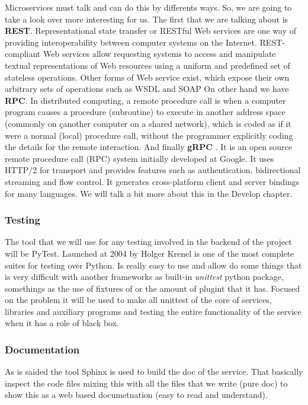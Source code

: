 Microservices must talk and can do this by differents ways. So, we are going to
take a look over more interesting for us.
\intro
The first that we are talking about is \textbf{REST}. Representational state transfer or
RESTful Web services are one way of providing interoperability between computer systems on the Internet. REST-compliant
Web services allow requesting systems to access and manipulate textual representations
of Web resources using a uniform and predefined set of stateless operations. Other
forms of Web service exist, which expose their own arbitrary sets of operations such as
WSDL and SOAP
\intro
On other hand we have \textbf{RPC}. In distributed computing, a remote procedure call  is when a computer program
causes a procedure (subroutine) to execute in another address space (commonly on
çanother computer on a shared network), which is coded as if it were a normal (local)
procedure call, without the programmer explicitly coding the details for the remote interaction.
\intro
And finally \textbf{gRPC} . It is an open source remote procedure call (RPC) system initially developed at
Google. It uses HTTP/2 for transport and provides features such as authentication, bidirectional streaming and
flow control.
It generates cross-platform client and server bindings for many languages.
We will talk a bit more about this in the Develop chapter.


\subsubsection{Testing}

The tool that we will use for any testing involved in the backend of the project
will be PyTest. Launched at 2004 by Holger Krenel is one of the most complete
suites for testing over Python.
Is really easy to use and allow do some things that is very difficult with another
frameworks as built-in \textit{unittest} python package, somethings as the use of
fixtures of or the amount of plugint that it has.
\intro
Focused on the problem it will be used to make all unittest of the core of services,
libraries and auxiliary programs and testing the entire functionality of the service
when it has a role of black box.


\subsubsection{Documentation}

As is saided the tool Sphinx is used to build the doc of the service.
That basically inspect the code files mixing this with all the files
that we write (pure doc) to show this as a web based documetnation
(easy to read and understand).


